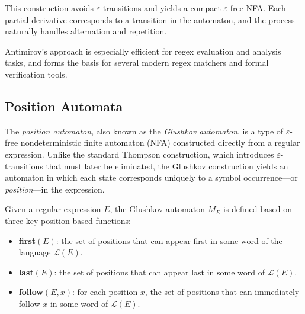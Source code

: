 This construction avoids $\varepsilon$-transitions and yields a compact $\varepsilon$-free NFA. Each partial derivative corresponds to a transition in the automaton, and the process naturally handles alternation and repetition.

Antimirov's approach is especially efficient for regex evaluation and analysis tasks, and forms the basis for several modern regex matchers and formal verification tools.

\subsection{Position Automata}


The \emph{position automaton}, also known as the \emph{Glushkov automaton}, is a type of $\varepsilon$-free nondeterministic finite automaton (NFA) constructed directly from a regular expression. Unlike the standard Thompson construction, which introduces $\varepsilon$-transitions that must later be eliminated, the Glushkov construction yields an automaton in which each state corresponds uniquely to a symbol occurrence---or \emph{position}---in the expression. \cite{mesh-of-automata}

Given a regular expression $E$, the Glushkov automaton $M_E$ is defined based on three key position-based functions:

\begin{itemize}
    \item \textbf{first$(E)$}: the set of positions that can appear first in some word of the language $\mathcal{L}(E)$.
    \item \textbf{last$(E)$}: the set of positions that can appear last in some word of $\mathcal{L}(E)$.
    \item \textbf{follow$(E, x)$}: for each position $x$, the set of positions that can immediately follow $x$ in some word of $\mathcal{L}(E)$.
\end{itemize}

